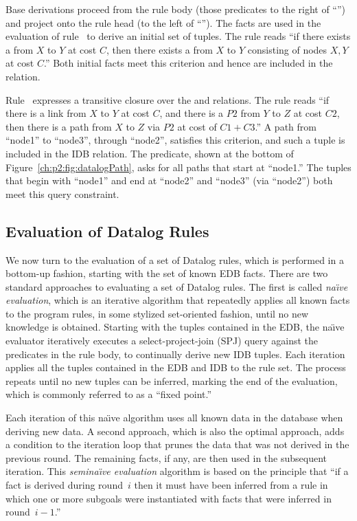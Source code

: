 Base derivations proceed from the rule body (those predicates to the right of
``\ol{:-}'') and project onto the rule head (to the left of ``\ol{:-}'').  The
 facts are used in the evaluation of rule~ to derive an initial
set of  tuples.  The rule reads ``if there exists a  from $X$
to $Y$ at cost $C$, then there exists a  from $X$ to $Y$ consisting of
nodes $X, Y$ at cost $C$.'' Both initial facts meet this criterion and hence
are included in the  relation.

Rule~ expresses a transitive closure over the  and
 relations.  The rule reads ``if there is a link from $X$ to $Y$ at
cost $C$, and there is a  $P2$ from $Y$ to $Z$ at cost $C2$, then
there is a path from $X$ to $Z$ via $P2$ at cost of $C1+C3$.'' A path from
``node1'' to ``node3'', through ``node2'', satisfies this criterion, and such a
tuple is included in the  IDB relation.  The predicate, shown at
the bottom of Figure~\ref{ch:p2:fig:datalogPath}, asks for all paths that start
at ``node1.'' The  tuples that begin with ``node1'' and end at
``node2'' and ``node3'' (via ``node2'') both meet this query constraint.

\subsection{Evaluation of Datalog Rules}
\label{ch:p2:sec:eval}

We now turn to the evaluation of a set of Datalog rules, which is performed in
a bottom-up fashion, starting with the set of known EDB facts.  There are two
standard approaches to evaluating a set of Datalog rules.  The first is called
{\em na\"{\i}ve evaluation}, which is an iterative algorithm that repeatedly
applies all known facts to the program rules, in some stylized set-oriented
fashion, until no new knowledge is obtained.  Starting with the tuples
contained in the EDB, the na\"{\i}ve evaluator iteratively executes a
select-project-join (SPJ) query against the predicates in the rule body, to
continually derive new IDB tuples.  Each iteration applies all the tuples
contained in the EDB and IDB to the rule set.  The process repeats until no new
tuples can be inferred, marking the end of the evaluation, which is commonly
referred to as a ``fixed point.''

Each iteration of this na\"{\i}ve algorithm uses all known data in the database
when deriving new data.  A second approach, which is also the optimal approach,
adds a condition to the iteration loop that prunes the data that was not
derived in the previous round.  The remaining facts, if any, are then used in
the subsequent iteration.  This {\em semina\"{\i}ve evaluation} algorithm is
based on the principle that ``if a fact is derived during round~$i$ then it
must have been inferred from a rule in which one or more subgoals were
instantiated with facts that were inferred in round~$i-1$.''~\cite{ullmanbook}


